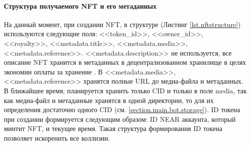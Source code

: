 \begin{figure}
    \centering
    \caption{}
\end{figure}

\paragraph{Структура получаемого NFT и его метаданных}
\label{section.main.bot.struct}
На данный момент, при создании NFT, в структуре (Листинг {\color{blue}\ref{lst.nftstructure}}) используются следующие поля: <<token\_id>>, <<owner\_id>>, <<royalty>>, <<metadata.title>>, <<metadata.media>>, <<metadata.reference>>. <<metadata.description>> не используется, все описание NFT хранится в метаданных в децентрализованном хранилище в целях экономии оплаты за хранение . В <<metadata.media>>, <<metadata.reference>> хранятся полные URL до медиа-файла и метаданных. В ближайшее время, планируется хранить только CID и только в поле media, так как медиа-файл и метаданные хранятся в одной директории, то для их определения достаточно одного CID (см. {\color{blue} \ref{section.main.bot.storage}}). ID токена при создании формируется следующим образом: ID NEAR аккаунта, который минтит NFT, и текущее время. Такая структура формирования ID токена позволяет искоренить все коллизии.

